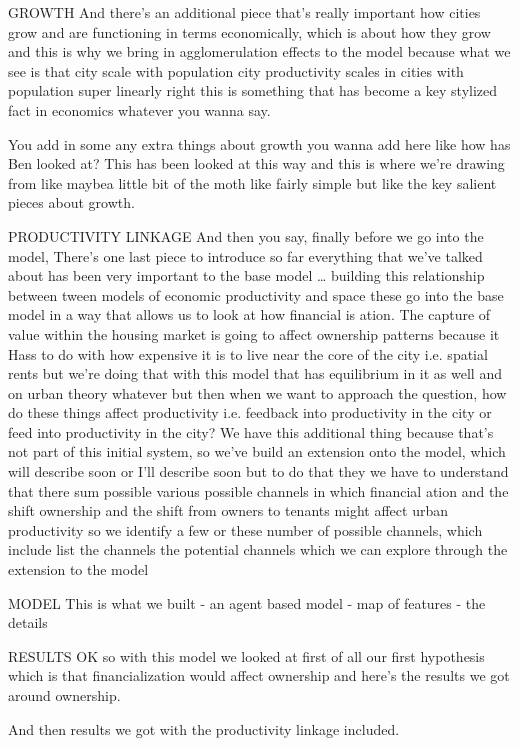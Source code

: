 GROWTH
And there’s an additional piece that’s really important how cities grow and are functioning in terms economically, which is about how they grow and this is why we bring in agglomerulation effects to the model because what we see is that city scale with population city productivity scales in cities with population super linearly right this is something that has become a key stylized fact in economics whatever you wanna say.

You add in some any extra things about growth you wanna add here like how has Ben looked at? This has been looked at this way and this is where we’re drawing from like maybea little bit of the moth like fairly simple but like the key salient pieces about growth.

PRODUCTIVITY LINKAGE
And then you say, finally before we go into the model, There’s one last piece to introduce so far everything that we’ve talked about has been very important to the base model …  building this relationship between tween models of economic productivity and space these go into the base model in a way that allows us to look at how financial is ation. The capture of value within the housing market is going to affect ownership patterns because it Hass to do with how expensive it is to live near the core of the city i.e. spatial rents but we’re doing that with this model that has equilibrium in it as well and on urban theory whatever but then when we want to approach the question, how do these things affect productivity i.e. feedback into productivity in the city or feed into productivity in the city? We have this additional thing because that’s not part of this initial system, so we’ve build an extension onto the model, which will describe soon or I’ll describe soon but to do that they we have to understand that there sum possible various possible channels in which financial ation and the shift ownership and the shift from owners to tenants might affect urban productivity so we identify a few or these number of possible channels, which include list the channels the potential channels which we can explore through the extension to the model



MODEL
This is what we built 
- an agent based model
- map of features
- the details

RESULTS
OK so with this model we looked at first of all our first hypothesis which is that financialization would affect ownership and here’s the results we got around ownership.

And then results we got with the productivity linkage included.

